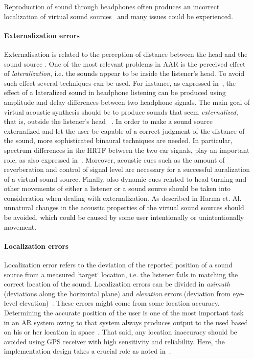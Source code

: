 \documentclass[journal]{IEEEtran}
\begin{document}
Reproduction of sound through headphones often produces an incorrect localization of virtual sound sources~\cite{harma2004} and many issues could be experienced.\\
\paragraph{Externalization errors}
Externalisation is related to the perception of distance between the head and the sound source \cite{Tame2012}. One of the most relevant problems in AAR is the perceived effect of \emph{lateralization}, i.e. the sounds appear to be inside the listener's head. To avoid such effect several techniques can be used. For instance, as expressed in~\cite{harma2004}, the effect of a lateralized sound in headphone listening can be produced using amplitude and delay differences between two headphone signals. The main goal of virtual acoustic synthesis should be to produce sounds that seem \emph{externalized}, that is, outside the listener's head ~\cite{begault2001}. In order to make a sound source externalized and let the user be capable of a correct judgment of the distance of the sound, more sophisticated binaural techniques are needed. In particular, spectrum differences in the HRTF between the two ear signals, play an important role, as also expressed in~\cite{harma2004}. Moreover, acoustic cues such as the amount of reverberation and control of signal level are necessary for a successful auralization of a virtual sound source. Finally, also dynamic cues related to head turning and other movements of either a listener or a sound source should be taken into consideration when dealing with externalization. As described in Harma et. Al.~\cite{harma2004} unnatural changes in the acoustic properties of the virtual sound sources should be avoided, which could be caused by some user intentionally or unintentionally movement.

\paragraph{Localization errors}
Localization error refers to the deviation of the reported position of a sound source from a measured `target` location, i.e. the listener fails in matching the correct location of the sound. Localization errors can be divided in \emph{azimuth} (deviations along the horizontal plane) and \emph{elevation} errors (deviation from eye-level elevation)~\cite{begault2001}. These errors might come from some location accuracy. Determining the accurate position of the user is one of the most important task in an AR system owing to that system always produces output to the used based on his or her location in space~\cite{rozier2000}. That said, any location inaccuracy should be avoided using GPS receiver with high sensitivity and reliability. Here, the implementation design takes a crucial role as noted in~\cite{alvarez2011}.
\end{document}
